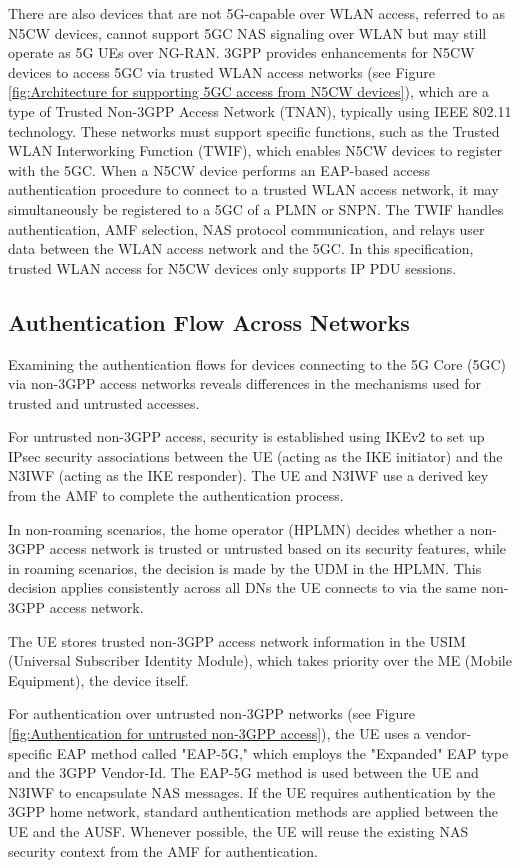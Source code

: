 There are also devices that are not 5G-capable over WLAN access, referred to as N5CW devices, cannot support 5GC NAS signaling over WLAN but may still operate as 5G UEs over NG-RAN. 3GPP provides enhancements for N5CW devices to access 5GC via trusted WLAN access networks (see Figure \ref{fig:Architecture for supporting 5GC access from N5CW devices}), which are a type of Trusted Non-3GPP Access Network (TNAN), typically using IEEE 802.11 technology. These networks must support specific functions, such as the Trusted WLAN Interworking Function (TWIF), which enables N5CW devices to register with the 5GC. When a N5CW device performs an EAP-based access authentication procedure to connect to a trusted WLAN access network, it may simultaneously be registered to a 5GC of a PLMN or SNPN. The TWIF handles authentication, AMF selection, NAS protocol communication, and relays user data between the WLAN access network and the 5GC. In this specification, trusted WLAN access for N5CW devices only supports IP PDU sessions.

\subsection{Authentication Flow Across Networks}
Examining the authentication flows for devices connecting to the 5G Core (5GC) via non-3GPP access networks reveals differences in the mechanisms used for trusted and untrusted accesses.

For untrusted non-3GPP access, security is established using IKEv2 to set up IPsec security associations between the UE (acting as the IKE initiator) and the N3IWF (acting as the IKE responder). The UE and N3IWF use a derived key from the AMF to complete the authentication process.

In non-roaming scenarios, the home operator (HPLMN) decides whether a non-3GPP access network is trusted or untrusted based on its security features, while in roaming scenarios, the decision is made by the UDM in the HPLMN. This decision applies consistently across all DNs the UE connects to via the same non-3GPP access network.

The UE stores trusted non-3GPP access network information in the USIM (Universal Subscriber Identity Module), which takes priority over the ME (Mobile Equipment), the device itself.

For authentication over untrusted non-3GPP networks (see Figure \ref{fig:Authentication for untrusted non-3GPP access}), the UE uses a vendor-specific EAP method called "EAP-5G," which employs the "Expanded" EAP type and the 3GPP Vendor-Id. The EAP-5G method is used between the UE and N3IWF to encapsulate NAS messages. If the UE requires authentication by the 3GPP home network, standard authentication methods are applied between the UE and the AUSF. Whenever possible, the UE will reuse the existing NAS security context from the AMF for authentication.

